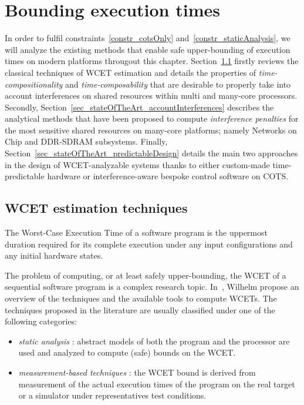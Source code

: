 \documentclass[main.tex]{subfiles}
\begin{document}
\chapter{Bounding execution times}
\thispagestyle{chapstyle}
\label{chap_boundingExecTimes}
\minitoc


In order to fulfil constraints~\ref{constr_cotsOnly} and~\ref{constr_staticAnalysis}, we will analyze the existing methods that enable safe upper-bounding of execution times on modern platforms througout this chapter. Section~\ref{sec_stateOfTheArt_WCETestimation} firstly reviews the classical techniques of WCET estimation and details the properties of \emph{time-compositionality} and \emph{time-composability} that are desirable to properly take into account interferences on shared resources within multi and many-core processors.
Secondly, Section~\ref{sec_stateOfTheArt_accountInterferences} describes the analytical methods that have been proposed to compute \emph{interference penalties} for the most sensitive shared resources on many-core platforms; namely Networks on Chip and DDR-SDRAM subsystems. Finally, Section~\ref{sec_stateOfTheArt_predictableDesign} details the main two approaches in the design of WCET-analyzable systems thanks to either custom-made time-predictable hardware or interference-aware bespoke control software on COTS.

\section{WCET estimation techniques}
\label{sec_stateOfTheArt_WCETestimation}

\begin{definition}
    \label{def_stateOfTheArt_WCET}
    The Worst-Case Execution Time of a software program is the uppermost duration required for its complete execution under any input configurations and any initial hardware states.
\end{definition}

The problem of computing, or at least safely upper-bounding, the WCET of a sequential software program is a complex research topic. In~\cite{Wilhelm2008}, Wilhelm \etal propose an overview of the techniques and the available tools to compute WCETs. The techniques proposed in the literature are usually classified under one of the following categories:
\begin{itemize}
    \item \emph{static analysis} : abstract models of both the program and the processor are used and analyzed to compute (safe) bounds on the WCET.
    \item \emph{measurement-based techniques} : the WCET bound is derived from measurement of the actual execution times of the program on the real target or a simulator under representatives test conditions.
\end{itemize}
\end{document}
